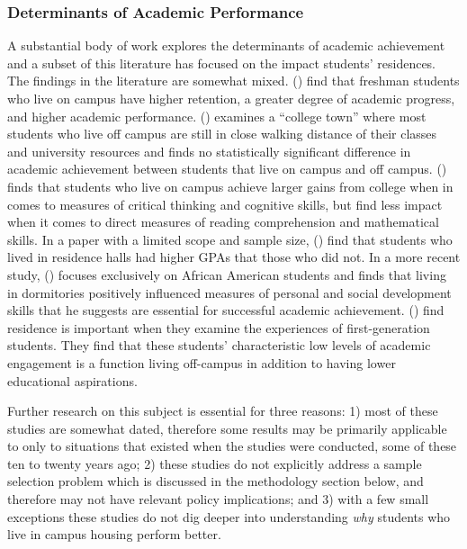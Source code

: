 \documentclass[11pt]{article}
\newcommand{\citee}[1]{\citename{#1} (\citeyear{#1})}
\begin{document}
\subsubsection{Determinants of Academic Performance}
A substantial body of work explores the determinants of academic achievement and a subset of this literature has focused on the impact students' residences.  The findings in the literature are somewhat mixed.  \citee{tsr1993} find that freshman students who live on campus have higher retention, a greater degree of academic progress, and higher academic performance.  \citee{delucchi1993} examines a ``college town'' where most students who live off campus are still in close walking distance of their classes and university resources and finds no statistically significant difference in academic achievement between students that live on campus and off campus.  \citee{pascarella1993} finds that students who live on campus achieve larger gains from college when in comes to measures of critical thinking and cognitive skills, but find less impact when it comes to direct measures of reading comprehension and mathematical skills.  In a paper with a limited scope and sample size, \citee{kanoy1996} find that students who lived in residence halls had higher GPAs that those who did not.  In a more recent study, \citee{flowers2004} focuses exclusively on African American students and finds that living in dormitories positively influenced measures of personal and social development skills that he suggests are essential for successful academic achievement.  \citee{pikekuh2005} find residence is important when they examine the experiences of first-generation students.  They find that these students' characteristic low levels of academic engagement is a function living off-campus in addition to having lower educational aspirations.

Further research on this subject is essential for three reasons: 1) most of these studies are somewhat dated, therefore some results may be primarily applicable to only to situations that existed when the studies were conducted, some of these ten to twenty years ago; 2) these studies do not explicitly address a sample selection problem which is discussed in the methodology section below, and therefore may not have relevant policy implications; and 3) with a few small exceptions these studies do not dig deeper into understanding \textit{why} students who live in campus housing perform better.
\end{document}
